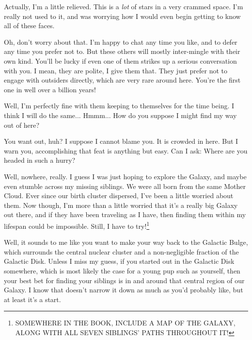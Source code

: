\documentclass[main.tex]{subfiles}
\begin{document}
\par \Sterope Actually, I'm a little relieved.  This is a \textit{lot} of stars in a very crammed space.  I'm really not used to it, and was worrying how I would even begin getting to know all of these faces.

\par \Enrico Oh, don't worry about that.  I'm happy to chat any time you like, and to defer any time you prefer not to.  But these others will mostly inter-mingle with their own kind.  You'll be lucky if even one of them strikes up a serious conversation with you.  I mean, they are polite, I give them that.  They just prefer not to engage with outsiders directly, which are very rare around here.  You're the first one in well over a billion years!  

\par \Sterope Well, I'm perfectly fine with them keeping to themselves for the time being.  I think I will do the same... Hmmm... How do you suppose I might find my way out of here?

\par \Enrico You want out, huh?  I suppose I cannot blame you.  It is crowded in here.  But I warn you, accomplishing that feat is anything but easy.  Can I ask:  Where are you headed in such a hurry?

\par \Sterope Well, nowhere, really.  I guess I was just hoping to explore the Galaxy, and maybe even stumble across my missing siblings.  We were all born from the same Mother Cloud.  Ever since our birth cluster dispersed, I've been a little worried about them.  Now though, I'm more than a little worried that it's a really big Galaxy out there, and if they have been traveling as I have, then finding them within my lifespan could be impossible.  Still, I have to try!\footnote{SOMEWHERE IN THE BOOK, INCLUDE A MAP OF THE GALAXY, ALONG WITH ALL SEVEN SIBLINGS' PATHS THROUGHOUT IT!}

\par \Enrico Well, it sounds to me like you want to make your way back to the Galactic Bulge, which surrounds the central nuclear cluster and a non-negligible fraction of the Galactic Disk.  Unless I miss my guess, if you started out in the Galactic Disk somewhere, which is most likely the case for a young pup such as yourself, then your best bet for finding your siblings is in and around that central region of our Galaxy.  I know that doesn't narrow it down as much as you'd probably like, but at least it's a start.
\end{document}
